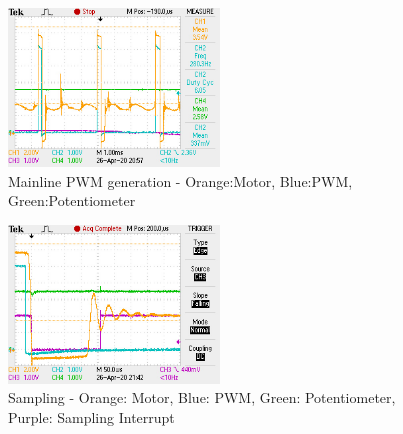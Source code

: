 \documentclass[a4paper]{article}
\begin{document}
\begin{figure}[h!]
    \centering
    \includegraphics[width=0.5\textwidth]{img/mainline.png}
    \caption{Mainline PWM generation - Orange:Motor, Blue:PWM, Green:Potentiometer}
\end{figure}

\begin{figure}[h!]
    \centering
    \includegraphics[width=0.5\textwidth]{img/sampling.png}
    \caption{Sampling - Orange: Motor, Blue: PWM, Green: Potentiometer, Purple: Sampling Interrupt}
\end{figure}
\end{document}

